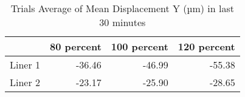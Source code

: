 \begin{table}[htbp]
\centering
\begin{tabular}{lrrr}
\toprule
  & 80 percent & 100 percent & 120 percent \\
\midrule
 Liner 1 & -36.46 & -46.99 & -55.38 \\
 Liner 2 & -23.17 & -25.90 & -28.65 \\
\bottomrule
\end{tabular}
\caption{Trials Average of Mean Displacement Y (µm) in last 30 minutes}
\label{fig:avg_results_table}
\end{table}